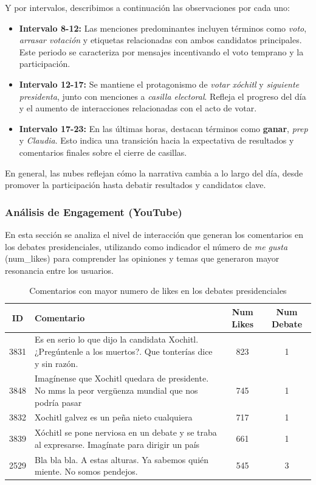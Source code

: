 \documentclass[10pt, a4paper]{article}
\begin{document}
	Y por intervalos, describimos a continuación las observaciones por cada uno:
	
	\begin{itemize}
		\item \textbf{Intervalo 8-12:} Las menciones predominantes incluyen términos como \textit{voto}, \textit{arrasar votación} y etiquetas relacionadas con ambos candidatos principales. Este periodo se caracteriza por mensajes incentivando el voto temprano y la participación.
		
		\item \textbf{Intervalo 12-17:} Se mantiene el protagonismo de \textit{votar xóchitl} y \textit{siguiente presidenta}, junto con menciones a \textit{casilla electoral}. Refleja el progreso del día y el aumento de interacciones relacionadas con el acto de votar.
		
		\item \textbf{Intervalo 17-23:} En las últimas horas, destacan términos como \textbf{ganar}, \textit{prep} y \textit{Claudia}. Esto indica una transición hacia la expectativa de resultados y comentarios finales sobre el cierre de casillas.
	\end{itemize}
	En general, las nubes reflejan cómo la narrativa cambia a lo largo del día, desde promover la participación hasta debatir resultados y candidatos clave.
	
	
	\subsubsection{Análisis de Engagement (YouTube)}
	
	En esta sección se analiza el nivel de interacción que generan los comentarios en los debates presidenciales, utilizando como indicador el número de \textit{me gusta} (num\_likes) para comprender las opiniones y temas que generaron mayor resonancia entre los usuarios.
	
	\begin{table}[H]
		\centering
		\begin{tabular}{|c|p{11cm}|c|c|}
			\hline
			\textbf{ID} & \textbf{Comentario} & \textbf{Num Likes} & \textbf{Num Debate} \\ \hline
			3831 & Es en serio lo que dijo la candidata Xochitl. ¿Pregúntenle a los muertos?. Que tonterías dice y sin razón. & 823 & 1 \\ \hline
			3848 & Imagínense que Xochitl quedara de presidente. No mms la peor vergüenza mundial que nos podría pasar & 745 & 1 \\ \hline
			3832 & Xochitl galvez es un peña nieto cualquiera & 717 & 1 \\ \hline
			3839 & Xóchitl se pone nerviosa en un debate y se traba al expresarse. Imagínate para dirigir un país & 661 & 1 \\ \hline
			2529 & Bla bla bla. A estas alturas. Ya sabemos quién miente. No somos pendejos. & 545 & 3 \\ \hline
		\end{tabular}
		\caption{Comentarios con mayor numero de likes en los debates presidenciales}
		\label{tab:comentarios_xochitl}
	\end{table}
\end{document}
